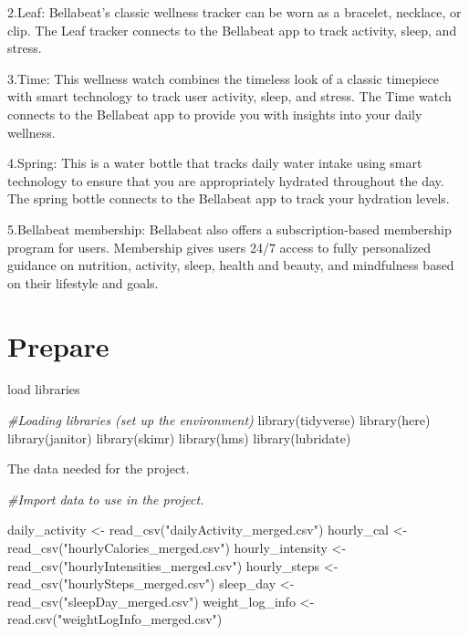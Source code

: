 \documentclass[
]{article}
\newenvironment{Shaded}{\begin{snugshade}}{\end{snugshade}}
\newcommand{\CommentTok}[1]{\textcolor[rgb]{0.56,0.35,0.01}{\textit{#1}}}
\newcommand{\FunctionTok}[1]{\textcolor[rgb]{0.00,0.00,0.00}{#1}}
\newcommand{\NormalTok}[1]{#1}
\newcommand{\OtherTok}[1]{\textcolor[rgb]{0.56,0.35,0.01}{#1}}
\newcommand{\StringTok}[1]{\textcolor[rgb]{0.31,0.60,0.02}{#1}}
\begin{document}
2.Leaf: Bellabeat's classic wellness tracker can be worn as a bracelet,
necklace, or clip. The Leaf tracker connects to the Bellabeat app to
track activity, sleep, and stress.

3.Time: This wellness watch combines the timeless look of a classic
timepiece with smart technology to track user activity, sleep, and
stress. The Time watch connects to the Bellabeat app to provide you with
insights into your daily wellness.

4.Spring: This is a water bottle that tracks daily water intake using
smart technology to ensure that you are appropriately hydrated
throughout the day. The spring bottle connects to the Bellabeat app to
track your hydration levels.

5.Bellabeat membership: Bellabeat also offers a subscription-based
membership program for users. Membership gives users 24/7 access to
fully personalized guidance on nutrition, activity, sleep, health and
beauty, and mindfulness based on their lifestyle and goals.

\hypertarget{prepare}{%
\section{Prepare}\label{prepare}}

load libraries

\begin{Shaded}
\begin{Highlighting}[]
\CommentTok{\#Loading libraries (set up the environment) }
\FunctionTok{library}\NormalTok{(tidyverse)}
\FunctionTok{library}\NormalTok{(here)}
\FunctionTok{library}\NormalTok{(janitor)}
\FunctionTok{library}\NormalTok{(skimr)}
\FunctionTok{library}\NormalTok{(hms)}
\FunctionTok{library}\NormalTok{(lubridate)}
\end{Highlighting}
\end{Shaded}

The data needed for the project.

\begin{Shaded}
\begin{Highlighting}[]
\CommentTok{\#Import data to use in the project.}

\NormalTok{daily\_activity }\OtherTok{\textless{}{-}} \FunctionTok{read\_csv}\NormalTok{(}\StringTok{"dailyActivity\_merged.csv"}\NormalTok{)}
\NormalTok{hourly\_cal }\OtherTok{\textless{}{-}} \FunctionTok{read\_csv}\NormalTok{(}\StringTok{"hourlyCalories\_merged.csv"}\NormalTok{)}
\NormalTok{hourly\_intensity }\OtherTok{\textless{}{-}} \FunctionTok{read\_csv}\NormalTok{(}\StringTok{"hourlyIntensities\_merged.csv"}\NormalTok{)}
\NormalTok{hourly\_steps }\OtherTok{\textless{}{-}} \FunctionTok{read\_csv}\NormalTok{(}\StringTok{"hourlySteps\_merged.csv"}\NormalTok{)}
\NormalTok{sleep\_day }\OtherTok{\textless{}{-}} \FunctionTok{read\_csv}\NormalTok{(}\StringTok{"sleepDay\_merged.csv"}\NormalTok{)}
\NormalTok{weight\_log\_info }\OtherTok{\textless{}{-}} \FunctionTok{read.csv}\NormalTok{(}\StringTok{"weightLogInfo\_merged.csv"}\NormalTok{)}
\end{Highlighting}
\end{Shaded}
\end{document}
